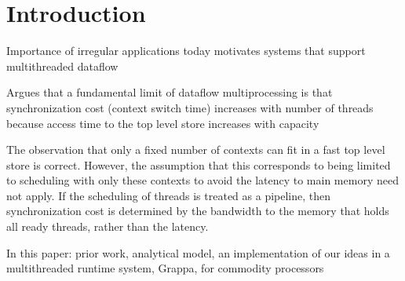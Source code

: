 \section{Introduction}

Importance of irregular applications today motivates systems that support multithreaded dataflow

 \cite{culler:93} Argues that a fundamental limit of dataflow multiprocessing is that synchronization cost (context switch time) increases with number of threads because access time to the top level store increases with capacity

The observation that only a fixed number of contexts can fit in a fast top level store is correct. However, the assumption that this corresponds to being limited to scheduling with only these contexts to avoid the latency to main memory need not apply. If the scheduling of threads is treated as a pipeline, then synchronization cost is determined by the bandwidth to the memory that holds all ready threads, rather than the latency.

In this paper: prior work, analytical model, an implementation of our ideas in a multithreaded runtime system, Grappa, for commodity processors

